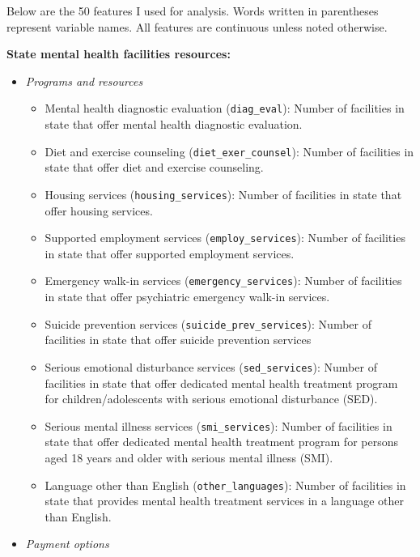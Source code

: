 \documentclass[
]{article}
\providecommand{\tightlist}{%
  \setlength{\itemsep}{0pt}\setlength{\parskip}{0pt}}
\begin{document}
Below are the 50 features I used for analysis. Words written in parentheses represent variable names. All features are continuous unless noted otherwise.

\textbf{State mental health facilities resources:}

\begin{itemize}
\tightlist
\item
  \emph{Programs and resources}

  \begin{itemize}
  \tightlist
  \item
    Mental health diagnostic evaluation (\texttt{diag\_eval}): Number of facilities in state that offer mental health diagnostic evaluation.
  \item
    Diet and exercise counseling (\texttt{diet\_exer\_counsel}): Number of facilities in state that offer diet and exercise counseling.
  \item
    Housing services (\texttt{housing\_services}): Number of facilities in state that offer housing services.
  \item
    Supported employment services (\texttt{employ\_services}): Number of facilities in state that offer supported employment services.
  \item
    Emergency walk-in services (\texttt{emergency\_services}): Number of facilities in state that offer psychiatric emergency walk-in services.
  \item
    Suicide prevention services (\texttt{suicide\_prev\_services}): Number of facilities in state that offer suicide prevention services
  \item
    Serious emotional disturbance services (\texttt{sed\_services}): Number of facilities in state that offer dedicated mental health treatment program for children/adolescents with serious emotional disturbance (SED).
  \item
    Serious mental illness services (\texttt{smi\_services}): Number of facilities in state that offer dedicated mental health treatment program for persons aged 18 years and older with serious mental illness (SMI).
  \item
    Language other than English (\texttt{other\_languages}): Number of facilities in state that provides mental health treatment services in a language other than
    English.
  \end{itemize}
\item
  \emph{Payment options}


\end{itemize}
\end{document}
